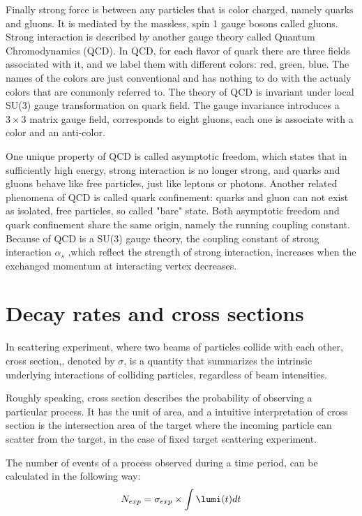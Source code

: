 Finally strong force is between any particles that is color charged, namely quarks and gluons. It is mediated by the massless, spin 1 gauge bosons called gluons. Strong interaction is described by another gauge theory called Quantum Chromodynamics (QCD). In QCD, for each flavor of quark there are three fields associated with it, and we label them with different colors: red, green, blue. The names of the colors are just conventional and has nothing to do with the actualy colors that are commonly referred to. The theory of QCD is invariant under local SU(3) gauge transformation on quark field. The gauge invariance introduces a $3\times3$ matrix gauge field, corresponds to eight gluons, each one is associate with a color and an anti-color. 

One unique property of QCD is called asymptotic freedom, which states that in sufficiently high energy, strong interaction is no longer strong, and quarks and gluons behave like free particles, just like leptons or photons. Another related phenomena of QCD is called quark confinement: quarks and gluon can not exist as isolated, free particles, so called "bare" state. Both asymptotic freedom and quark confinement share the same origin, namely the running coupling constant. Because of QCD is a SU(3) gauge theory, the coupling constant of strong interaction $\alpha_s$ ,which reflect the strength of strong interaction, increases when the exchanged momentum at interacting vertex decreases.


\section{Decay rates and cross sections}
In scattering experiment, where two beams of particles collide with each other, cross section,, denoted by $\sigma$, is a quantity that summarizes the intrinsic underlying interactions of colliding particles, regardless of beam intensities. 

Roughly speaking, cross section describes the probability of observing a particular process. It has the unit of area, and a intuitive interpretation of cross section is the intersection area of the target where the incoming particle can scatter from the target, in the case of fixed target scattering experiment. 

The number of events of a process observed during a time period, can be calculated in the following way:
\begin{equation}
N_{exp} = \sigma_{exp}\times\int\lumi(t)dt
\end{equation}

